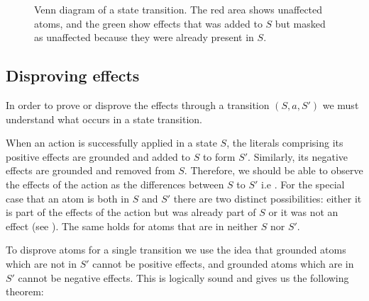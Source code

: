 \documentclass[../Master.tex]{subfiles}
\begin{document}
\begin{figure}
	\def\firstcircle{(0,0) circle (1.5cm)}
	\def\secondcircle{(0:2cm) circle (1.5cm)}
	\def\thirdcircle{(0:3.8cm) circle (2.9cm)}
	\centering
    \caption{\label{fig:nca:venn-of-effects} Venn diagram of a state transition. The red area shows unaffected atoms, and the green show effects that was added to $S$ but masked as unaffected because they were already present in $S$.}
\end{figure}


\subsection{Disproving effects}
In order to prove or disprove the effects through a transition $(S,a,S')$ we must understand what occurs in a state transition.

When an action is successfully applied in a state $S$, the literals comprising its positive effects are grounded and added to $S$ to form $S'$. Similarly, its negative effects are grounded and removed from $S$. Therefore, we should be able to observe the effects of the action as the differences between $S$ to $S'$ i.e \geffects. For the special case that an atom is both in $S$ and $S'$ there are two distinct possibilities: either it is part of the effects of the action but was already part of $S$ or it was not an effect (see ). The same holds for atoms that are in neither $S$ nor $S'$.

To disprove atoms for a single transition we use the idea that grounded atoms which are not in $S'$ cannot be positive effects, and grounded atoms which are in $S'$ cannot be negative effects. 
This is logically sound and gives us the following theorem:
\end{document}

